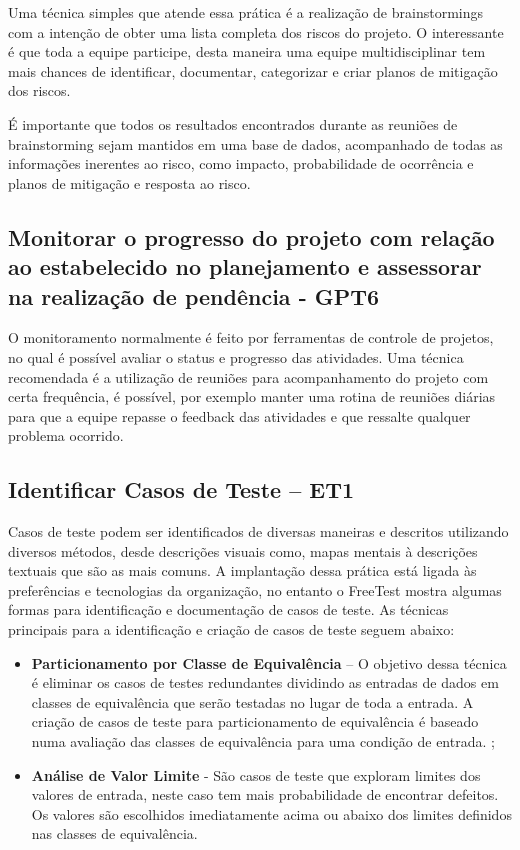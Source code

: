 Uma técnica simples que atende essa prática é a realização de brainstormings com a intenção de obter uma lista completa dos riscos do projeto. O interessante é que toda a equipe participe, desta maneira uma equipe multidisciplinar tem mais chances de identificar, documentar, categorizar e criar planos de mitigação dos riscos.

É importante que todos os resultados encontrados durante as reuniões de brainstorming sejam mantidos em uma base de dados, acompanhado de todas as informações inerentes ao risco, como impacto, probabilidade de ocorrência e planos de mitigação e resposta ao risco.

\subsection{Monitorar o progresso do projeto com relação ao estabelecido no planejamento e assessorar na realização de pendência - GPT6}
\label{sec:guiagpt6}

O monitoramento normalmente é feito por ferramentas de controle de projetos, no qual é possível avaliar o status e progresso das atividades. Uma técnica recomendada é a utilização de reuniões para acompanhamento do projeto com certa frequência, é possível, por exemplo manter uma rotina de reuniões diárias para que a equipe repasse o feedback das atividades e que ressalte qualquer problema ocorrido.

\subsection{Identificar Casos de Teste – ET1}
\label{sec:guiaet1}

Casos de teste podem ser identificados de diversas maneiras e descritos utilizando diversos métodos, desde descrições visuais como, mapas mentais à descrições textuais que são as mais comuns. A implantação dessa prática está ligada às preferências e tecnologias da organização, no entanto o FreeTest mostra algumas formas para identificação e documentação de casos de teste. As técnicas principais para a identificação e criação de casos de teste seguem abaixo:

\begin{itemize}
    \item \textbf{Particionamento por Classe de Equivalência} – O objetivo dessa técnica é eliminar os casos de testes redundantes dividindo as entradas de dados em classes de equivalência que serão testadas no lugar de toda a entrada. A criação de casos de teste para particionamento de equivalência é baseado numa avaliação das classes de equivalência para uma condição de entrada. ;
    \item \textbf{Análise de Valor Limite} - São casos de teste que exploram limites dos valores de entrada, neste caso tem mais probabilidade de encontrar defeitos. Os valores são escolhidos imediatamente acima ou abaixo dos limites definidos nas classes de equivalência.
\end{itemize}

